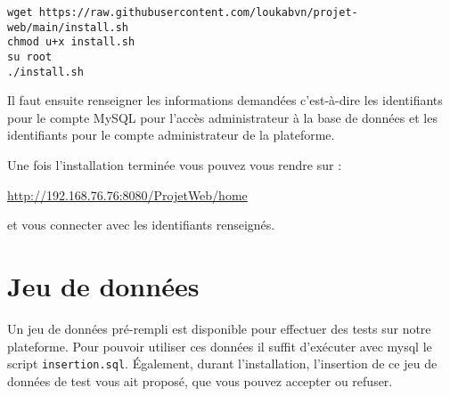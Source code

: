 \begin{verbatim}
wget https://raw.githubusercontent.com/loukabvn/projet-web/main/install.sh
chmod u+x install.sh
su root
./install.sh
\end{verbatim}

Il faut ensuite renseigner les informations demandées c'est-à-dire les identifiants pour le
compte MySQL pour l'accès administrateur à la base de données et les identifiants pour le compte
administrateur de la plateforme.

Une fois l'installation terminée vous pouvez vous rendre sur :
\begin{center}
    \url{http://192.168.76.76:8080/ProjetWeb/home}
\end{center}
et vous connecter avec les identifiants renseignés.

\section{Jeu de données}

Un jeu de données pré-rempli est disponible pour effectuer des tests sur notre plateforme.
Pour pouvoir utiliser ces données il suffit d'exécuter avec mysql le script \verb:insertion.sql:.
Également, durant l'installation, l'insertion de ce jeu de données de test vous ait proposé, que
vous pouvez accepter ou refuser.

